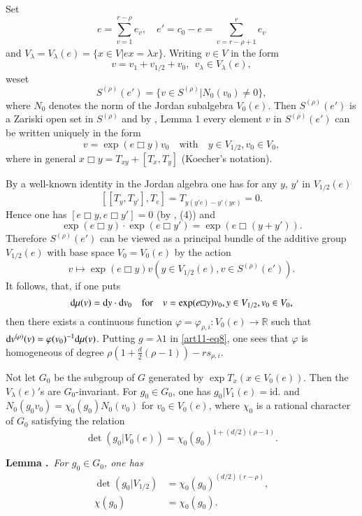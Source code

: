 Set
$$
e=\sum\limits^{r-\rho}_{v=1}e_{v},\quad e'=c_{0}-e=\sum\limits^{r}_{v=r-\rho+1}e_{v}
$$
and $V_{\lambda}=V_{\lambda}(e)=\{x\in V|ex=\lambda x\}$. Writing $v\in V$ in the form
$$
v=v_{1}+v_{1/2}+v_{0}, \ \ v_{\lambda}\in V_{\lambda}(e),
$$
we\pageoriginale set
\begin{equation}
S^{(\rho)}(e')=\{v\in S^{(\rho)}|N_{0}(v_{0})\neq 0\},\label{art11-eq9}
\end{equation}
where $N_{0}$ denotes the norm of the Jordan subalgebra $V_{0}(e)$. Then $S^{(\rho)}(e')$ is a Zariski open set in $S^{(\rho)}$ and by \cite{art11-keyS3}, Lemma 1 every element $v$ in $S^{(\rho)}(e')$ can be written uniquely in the form
\begin{equation}
v=\exp(e\Box y)v_{0}\quad\text{with}\quad y\in V_{1/2}, v_{0}\in V_{0},\label{art11-eq10}
\end{equation}
where in general $x\Box y=T_{xy}+[T_{x},T_{y}]$ (Koecher's notation).

By a well-known identity in the Jordan algebra one has for any $y$, $y'$ in $V_{1/2}(e)$
$$
[[T_{y},T_{y'}],T_{e}]=T_{y(y'e)-y'(ye)}=0.
$$
Hence one has $[e\Box y, e\Box y']=0$ (by \cite{art11-keyS3}, (4)) and
$$
\exp(e\Box y)\cdot \exp (e\Box y')=\exp(e\Box (y+y')).
$$
Therefore $S^{(\rho)}(e')$ can be viewed as a principal bundle of the additive group $V_{1/2}(e)$ with base space $V_{0}=V_{0}(e)$ by the action 
$$
v\mapsto \exp(e\Box y)v(y\in V_{1/2}(e),v\in S^{(\rho)}(e')).
$$
It follows, that, if one puts
$$
\mathrm{d} \mu(v)=\mathrm{d} y\cdot \mathrm{d} v_{0}\quad\text{for}\quad v=\exp(e\Box y)v_{0}, y\in V_{1/2}, v_{0}\in V_{0},
$$
then there exists a continuous function $\varphi=\varphi_{\rho,i}:V_{0}(e)\to \mathbb{R}$ such that $\mathrm{d} v^{(\rho)}(v)=\varphi(v_{0})^{-1}\mathrm{d} \mu(v)$. Putting $g=\lambda 1$ in \eqref{art11-eq8}, one sees that $\varphi$ is homogeneous of degree $\rho(1+\frac{d}{2}(\rho-1))-rs_{\rho,i}$.

Not let $G_{0}$ be the subgroup of $G$ generated by $\exp T_{x}(x\in V_{0}(e))$. Then the $V_{\lambda}(e)'$s are $G_{0}$-invariant. For $g_{0}\in G_{0}$, one has $g_{0}|V_{1}(e)=\text{id.}$ and $N_{0}(g_{0}v_{0})=\chi_{0}(g_{0})N_{0}(v_{0})$ for $v_{0}\in V_{0}(e)$, where $\chi_{0}$ is a rational character of $G_{0}$ satisfying the relation
\begin{equation}
\det (g_{0}|V_{0}(e))=\chi_{0}(g_{0})^{1+(d/2)(\rho-1)}.\label{art11-eq11}
\end{equation}

\medskip
\noindent
{\bf Lemma .\label{art11-lem2}}~{\em For $g_{0}\in G_{0}$, one has}
\begin{align}
\det (g_{0}|V_{1/2}) &= \chi_{0}(g_{0})^{(d/2)(r-\rho)},\label{art11-eq12}\\
\chi(g_{0}) &=\chi_{0}(g_{0}).\label{art11-eq13}
\end{align}

